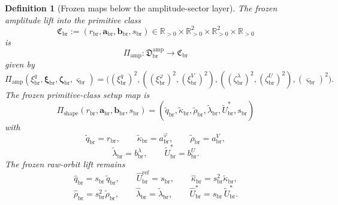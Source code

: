 \documentclass[11pt]{article}
\newcommand{\RespShapeReadout}{\widetilde q_{\mathrm{br}}}
\newcommand{\RespShapeCov}{\widetilde\kappa_{\mathrm{br}}}
\newcommand{\RespShapeRelax}{\widetilde\rho_{\mathrm{br}}}
\newcommand{\RespShapeWell}{\widetilde\lambda_{\mathrm{br}}}
\newcommand{\RespShapeEq}{\widetilde U_{\mathrm{br}}^{\ast}}
\newcommand{\RespRawReadout}{\widehat q_{\mathrm{br}}}
\newcommand{\RespRawRef}{\widehat U_{\mathrm{br}}^{\mathrm{ref}}}
\newcommand{\RespRawCov}{\widehat\kappa_{\mathrm{br}}}
\newcommand{\RespRawRelax}{\widehat\rho_{\mathrm{br}}}
\newcommand{\RespRawWell}{\widehat\lambda_{\mathrm{br}}}
\newcommand{\RespRawEq}{\widehat U_{\mathrm{br}}^{\ast}}
\newcommand{\ScaleMod}{s_{\mathrm{br}}}
\newcommand{\PrimClass}{\mathfrak C_{\mathrm{br}}}
\newcommand{\PrimRead}{r_{\mathrm{br}}}
\newcommand{\PrimCovSlot}{a_{\mathrm{br}}^{\varphi}}
\newcommand{\PrimRelaxSlot}{a_{\mathrm{br}}^{V}}
\newcommand{\PrimKinetic}{\bm a_{\mathrm{br}}}
\newcommand{\PrimWellSlot}{b_{\mathrm{br}}^{\lambda}}
\newcommand{\PrimEqSlot}{b_{\mathrm{br}}^{U}}
\newcommand{\PrimAnchor}{\bm b_{\mathrm{br}}}
\newcommand{\LiftSector}{\mathfrak D_{\mathrm{br}}^{\mathrm{amp}}}
\newcommand{\DeepReadAmp}{\xi_{\mathrm{br}}^{q}}
\newcommand{\DeepCovAmp}{\xi_{\mathrm{br}}^{\varphi}}
\newcommand{\DeepRelaxAmp}{\xi_{\mathrm{br}}^{V}}
\newcommand{\DeepKinAmp}{\bm\xi_{\mathrm{br}}}
\newcommand{\DeepWellAmp}{\zeta_{\mathrm{br}}^{\lambda}}
\newcommand{\DeepEqAmp}{\zeta_{\mathrm{br}}^{U}}
\newcommand{\DeepAnchorAmp}{\bm\zeta_{\mathrm{br}}}
\newcommand{\DeepScaleAmp}{\varsigma_{\mathrm{br}}}
\newcommand{\AmpMap}{\Pi_{\mathrm{amp}}}
\newcommand{\PrimMap}{\Pi_{\mathrm{shape}}}
\newtheorem{definition}{Definition}
\begin{document}
\begin{definition}[Frozen maps below the amplitude-sector layer]
\label{def:frozenmaps}
The frozen amplitude lift into the primitive class
\begin{equation}
\PrimClass
:=
(\PrimRead,\PrimKinetic,\PrimAnchor,\ScaleMod)
\in
\mathbb R_{>0}\times\mathbb R_{>0}^{2}\times\mathbb R_{>0}^{2}\times\mathbb R_{>0}
\label{eq:primclass}
\end{equation}
is
\begin{equation}
\AmpMap:\LiftSector\longrightarrow\PrimClass
\label{eq:ampmap}
\end{equation}
given by
\begin{equation}
\AmpMap(\DeepReadAmp,\DeepKinAmp,\DeepAnchorAmp,\DeepScaleAmp)
=
\bigl(
(\DeepReadAmp)^{2},
((\DeepCovAmp)^{2},(\DeepRelaxAmp)^{2}),
((\DeepWellAmp)^{2},(\DeepEqAmp)^{2}),
(\DeepScaleAmp)^{2}
\bigr).
\label{eq:ampmapexplicit}
\end{equation}
The frozen primitive-class setup map is
\begin{equation}
\PrimMap(\PrimRead,\PrimKinetic,\PrimAnchor,\ScaleMod)
=
(\RespShapeReadout,\RespShapeCov,\RespShapeRelax,\RespShapeWell,\RespShapeEq,\ScaleMod)
\label{eq:primmap}
\end{equation}
with
\begin{equation}
\RespShapeReadout=\PrimRead,
\qquad
\RespShapeCov=\PrimCovSlot,
\qquad
\RespShapeRelax=\PrimRelaxSlot,
\label{eq:shapeA}
\end{equation}
\begin{equation}
\RespShapeWell=\PrimWellSlot,
\qquad
\RespShapeEq=\PrimEqSlot.
\label{eq:shapeB}
\end{equation}
The frozen raw-orbit lift remains
\begin{equation}
\RespRawReadout=\ScaleMod\,\RespShapeReadout,
\qquad
\RespRawRef=\ScaleMod,
\qquad
\RespRawCov=\ScaleMod^{2}\RespShapeCov,
\label{eq:rawliftA}
\end{equation}
\begin{equation}
\RespRawRelax=\ScaleMod^{2}\RespShapeRelax,
\qquad
\RespRawWell=\RespShapeWell,
\qquad
\RespRawEq=\ScaleMod\,\RespShapeEq.
\label{eq:rawliftB}
\end{equation}
\end{definition}
\end{document}
